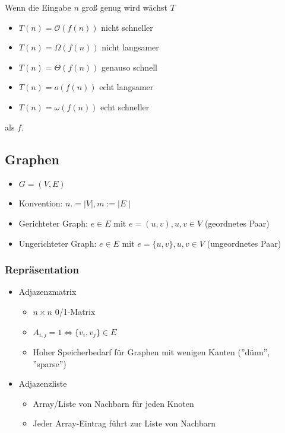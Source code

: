 \documentclass{scrartcl}
\begin{document}
Wenn die Eingabe $ n $ groß genug wird wächst $ T $
\begin{itemize}
	\item $ T(n) = \mathcal{O}(f(n)) $ \hfill nicht schneller
	\item $ T(n) = \Omega(f(n)) $ \hfill nicht langsamer
	\item $ T(n) = \Theta(f(n)) $ \hfill genauso schnell
	\item $ T(n) = o(f(n)) $ \hfill echt langsamer
	\item $ T(n) = \omega(f(n)) $ \hfill echt schneller
\end{itemize}
als $ f $.

\subsection{Graphen}

\begin{itemize}
	\item $ G = (V,E) $
	\item Konvention: $ n .= \mid V \mid, m:= \mid E \mid $
	\item Gerichteter Graph: $ e \in E $ mit $ e = (u,v), u, v \in V $ (geordnetes Paar) \\
	
	\item Ungerichteter Graph: $ e \in E $ mit $ e = \{ u,v \}, u, v \in V $ (ungeordnetes Paar) \\
	
\end{itemize}

\subsubsection{Repräsentation}



\begin{itemize}
	\item Adjazenzmatrix
	\begin{itemize}
		\item $ n \times n $ 0/1-Matrix
		\item $ A_{i,j} = 1 \iff \{ v_i,v_j \} \in E $
		\item Hoher Speicherbedarf für Graphen mit wenigen Kanten (''dünn'', ''sparse'')
	\end{itemize}
	
	\item Adjazenzliste
	\begin{itemize}
		\item Array/Liste von Nachbarn für jeden Knoten
		\item Jeder Array-Eintrag führt zur Liste von Nachbarn
	\end{itemize}
	
\end{itemize}
\end{document}
